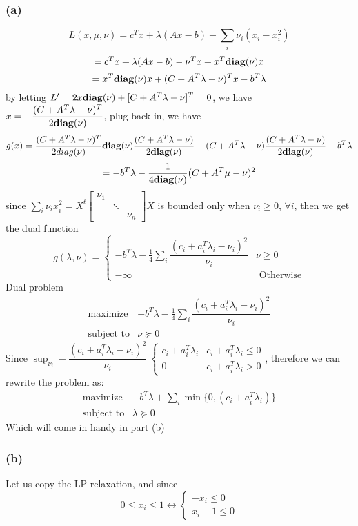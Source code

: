 \documentclass{article}
\newcommand{\diag}{{\mbox{\bf diag}}}
\begin{document}
\subsubsection*{(a)}
\[L(x, \mu, \nu) = c^Tx + \lambda (Ax- b) - \sum_i\nu_i(x_i - x_i^2) \]
\[= c^Tx + \lambda (Ax- b) - \nu^Tx + x^T\diag(\nu)x \]
\[ = x^T\diag(\nu) x + (C + A^T\lambda - \nu)^Tx - b^T\lambda \]
by letting $L' = 2x\diag(\nu) + [C + A^T\lambda - \nu]^T = 0$, we have $x = -\dfrac{(C + A^T\lambda - \nu)^T}{2\diag(\nu)}$, plug back in, we have 
\[g(x) = \dfrac{(C + A^T\lambda - \nu)^T}{2diag(\nu)}\diag(\nu)\dfrac{(C + A^T\lambda - \nu)}{2 \diag (\nu)} - (C + A^T\lambda - \nu)\dfrac{(C + A^T \lambda - \nu)}{2 \diag(\nu)}  - b^T\lambda \]
\[ =- b^T\lambda - \frac{1}{4 \diag(\nu)}(C + A^T\mu - \nu)^2 \]
since $ \sum_i\nu_ix_i^2 = X^t \begin{bmatrix}
\nu_1 & & \\
 & \ddots& \\
 &&\nu_n
\end{bmatrix} X$ is bounded only when $\nu_i \ge 0, \, \forall i $, then
we get  the dual function
\[g(\lambda, \nu) = \begin{cases}
- b^T\lambda - \frac{1}{4 }\sum_i \dfrac{(c_i + a_i^T\lambda_i - \nu_i)^2}{\nu_i} & \nu \ge 0 \\
-\infty& \mbox{ Otherwise}
\end{cases}
\]
Dual problem 
 \[  \boxed{  \begin{array}{ll}
    \mbox{maximize}   &   -b^T\lambda - \frac{1}{4 }\sum_i \dfrac{(c_i + a_i^T\lambda_i - \nu_i)^2}{\nu_i} \\
    \mbox{subject to} & \nu \succeq 0   
         \end{array} 
         }
  \]    
  Since $\sup_{\nu_i} - \dfrac{(c_i + a_i^T\lambda_i - \nu_i)^2}{\nu_i}\ \begin{cases}
  c_i + a_i^T\lambda_i  & c_i + a_i^T\lambda_i  \le 0\\
  0 & c_i + a_i^T\lambda_i > 0
  \end{cases}
  $, therefore we can rewrite the problem as: 
\[
  \boxed{  \begin{array}{ll}
    \mbox{maximize}   &   -b^T\lambda + \sum_i \min \{0, (c_i + a_i^T\lambda_i) \}\\
    \mbox{subject to} & \lambda \succeq 0   
         \end{array} 
         }
\]
  Which will come in handy in part (b)
\subsubsection*{(b)}
Let us copy the LP-relaxation, and since \[
0 \le x_i \le 1 \leftrightarrow \begin{cases}
-x_i \le 0 \\
x_i -1 \le 0
\end{cases}
\]
\end{document}
